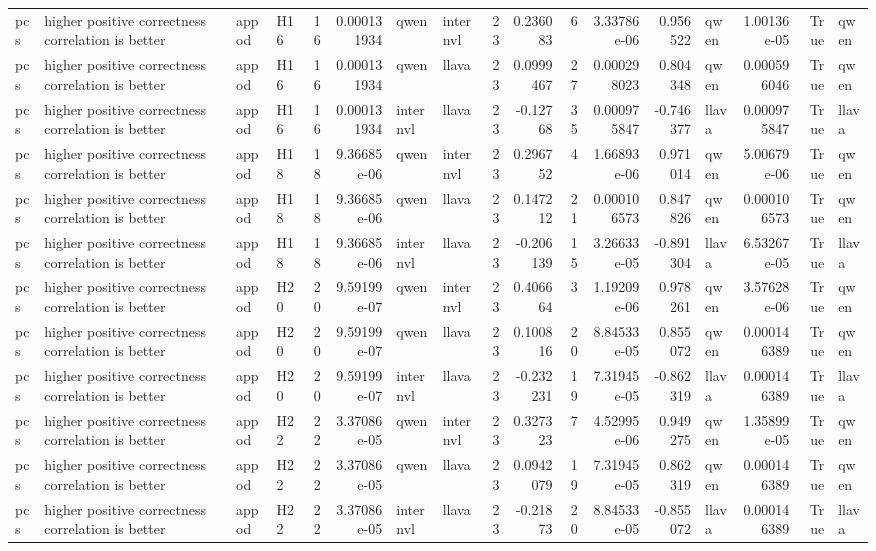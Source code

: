 \begin{longtable}{llllrrllrrrrrlrrl}
pcs & higher positive correctness correlation is better & appod & H16 & 16 & 0.000131934 & qwen & internvl & 23 & 0.236083 & 6 & 3.33786e-06 & 0.956522 & qwen & 1.00136e-05 & True & qwen \\
pcs & higher positive correctness correlation is better & appod & H16 & 16 & 0.000131934 & qwen & llava & 23 & 0.0999467 & 27 & 0.000298023 & 0.804348 & qwen & 0.000596046 & True & qwen \\
pcs & higher positive correctness correlation is better & appod & H16 & 16 & 0.000131934 & internvl & llava & 23 & -0.12768 & 35 & 0.000975847 & -0.746377 & llava & 0.000975847 & True & llava \\
pcs & higher positive correctness correlation is better & appod & H18 & 18 & 9.36685e-06 & qwen & internvl & 23 & 0.296752 & 4 & 1.66893e-06 & 0.971014 & qwen & 5.00679e-06 & True & qwen \\
pcs & higher positive correctness correlation is better & appod & H18 & 18 & 9.36685e-06 & qwen & llava & 23 & 0.147212 & 21 & 0.000106573 & 0.847826 & qwen & 0.000106573 & True & qwen \\
pcs & higher positive correctness correlation is better & appod & H18 & 18 & 9.36685e-06 & internvl & llava & 23 & -0.206139 & 15 & 3.26633e-05 & -0.891304 & llava & 6.53267e-05 & True & llava \\
pcs & higher positive correctness correlation is better & appod & H20 & 20 & 9.59199e-07 & qwen & internvl & 23 & 0.406664 & 3 & 1.19209e-06 & 0.978261 & qwen & 3.57628e-06 & True & qwen \\
pcs & higher positive correctness correlation is better & appod & H20 & 20 & 9.59199e-07 & qwen & llava & 23 & 0.100816 & 20 & 8.84533e-05 & 0.855072 & qwen & 0.000146389 & True & qwen \\
pcs & higher positive correctness correlation is better & appod & H20 & 20 & 9.59199e-07 & internvl & llava & 23 & -0.232231 & 19 & 7.31945e-05 & -0.862319 & llava & 0.000146389 & True & llava \\
pcs & higher positive correctness correlation is better & appod & H22 & 22 & 3.37086e-05 & qwen & internvl & 23 & 0.327323 & 7 & 4.52995e-06 & 0.949275 & qwen & 1.35899e-05 & True & qwen \\
pcs & higher positive correctness correlation is better & appod & H22 & 22 & 3.37086e-05 & qwen & llava & 23 & 0.0942079 & 19 & 7.31945e-05 & 0.862319 & qwen & 0.000146389 & True & qwen \\
pcs & higher positive correctness correlation is better & appod & H22 & 22 & 3.37086e-05 & internvl & llava & 23 & -0.21873 & 20 & 8.84533e-05 & -0.855072 & llava & 0.000146389 & True & llava \\

\end{longtable}
